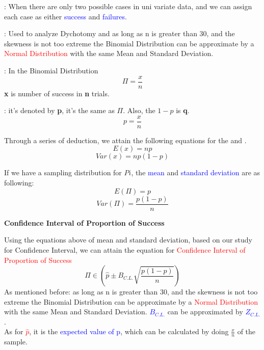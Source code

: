 \begin{description}
    \item {} : When there are only two possible cases in uni variate data, and we can assign each case as either \textcolor{blue}{success} and \textcolor{blue}{failures}.
    \item {} : Used to analyze Dychotomy and as long as n is greater than 30, and the skewness is not too extreme  the Binomial Distribution can be approximate by a \textcolor{red}{Normal Distribution} with the same Mean and Standard Deviation.
    \item {} : In the Binomial Distribution
    \begin{equation}
        \Pi=\frac{x}{n}
    \end{equation}
    \textbf{x} is number of success in \textbf{n} trials.
    \item {} : it's denoted by \textbf{p}, it's the same as \(\Pi\). Also, the \(1-p\) is \textbf{q}.
        \begin{equation}
        p=\frac{x}{n}
    \end{equation}
\end{description}

Through a series of deduction, we attain the following equations for the  and .
\begin{equation}
    E(x)=np
\end{equation}
\begin{equation}
    Var(x)=np(1-p)
\end{equation}

If we have a sampling distribution for \(Pi\), the \textcolor{blue}{mean} and \textcolor{blue}{standard deviation} are as following:
\begin{equation}
    E(\Pi)=p    
\end{equation}
\begin{equation}
    Var(\Pi)=\frac{p(1-p)}{n}
\end{equation}

\vspace{5ex}
\begin{Center}
    \textbf{Confidence Interval of Proportion of Success}
\end{Center}
Using the equations above of mean and standard deviation, based on our study for Confidence Interval, we can attain the equation for \textcolor{red}{Confidence Interval of Proportion of Success}
\begin{equation}
    \Pi\in(\hat{p}\pm B_{C.L.}\sqrt{\frac{p(1-p)}{n}})
\end{equation}
As mentioned before: as long as n is greater than 30, and the skewness is not too extreme  the Binomial Distribution can be approximate by a \textcolor{red}{Normal Distribution} with the same Mean and Standard Deviation. \textcolor{blue}{\(B_{C.L.}\)} can be approximated by \textcolor{blue}{\(Z_{C.L.}\)}.\\
As for \textcolor{red}{\(\hat{p}\)}, it is the \textcolor{blue}{expected value of p}, which can be calculated by doing \(\frac{x}{n}\) of the sample.

